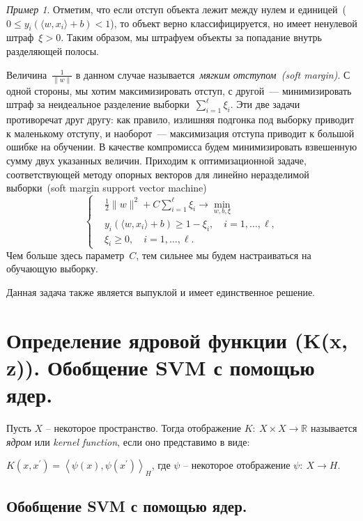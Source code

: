 \documentclass[a4paper, 12pt]{article}
\theoremstyle{plain} %
\theoremstyle{definition} %
\theoremstyle{remark} %
\newtheorem{example}{Пример}
\begin{document}
\begin{example}
Отметим, что если отступ объекта лежит между нулем и
единицей~($0 \leq y_i \left( \langle w, x_i \rangle + b \right) < 1$),
то объект верно классифицируется, но имеет ненулевой штраф~$\xi > 0$.
Таким образом, мы штрафуем объекты за попадание внутрь разделяющей полосы.

Величина~$\frac{1}{\|w\|}$ в данном случае называется~\emph{мягким отступом~(soft margin)}.
С одной стороны, мы хотим максимизировать отступ, с другой~--- минимизировать
штраф за неидеальное разделение выборки~$\sum_{i = 1}^{\ell} \xi_i$.
Эти две задачи противоречат друг другу: как правило, излишняя подгонка под
выборку приводит к маленькому отступу, и наоборот~--- максимизация отступа
приводит к большой ошибке на обучении.
В качестве компромисса будем минимизировать взвешенную сумму двух указанных величин.
Приходим к оптимизационной задаче,
соответствующей методу опорных векторов для линейно неразделимой выборки~(soft margin support vector machine)
\begin{equation}
\label{eq:svmUnsep}
    \left\{
        \begin{aligned}
            & \frac{1}{2} \|w\|^2 + C \sum_{i = 1}^{\ell} \xi_i \to \min_{w, b, \xi} \\
            & y_i \left(
                \langle w, x_i \rangle + b
            \right) \geq 1 - \xi_i, \quad i = 1, \dots, \ell, \\
            & \xi_i \geq 0, \quad i = 1, \dots, \ell.
        \end{aligned}
    \right.
\end{equation}
Чем больше здесь параметр~$C$, тем сильнее мы будем настраиваться на обучающую выборку.

Данная задача также является выпуклой и имеет единственное решение.

\section{Определение ядровой функции (K(x, z)). Обобщение SVM с помощью ядер.}

Пусть $X$ – некоторое пространство. Тогда отображение $K:\ X \times X \to \mathbb R$ называется \emph{ядром} или \emph{kernel function}, если оно представимо в виде:

$K \left(x,x^{\prime} \right) = \left< \psi(x), \psi (x^{\prime}) \right>_H $, где $ \psi $ – некоторое отображение $\psi:\ X \to H $.

\subsection{Обобщение SVM с помощью ядер.}


\end{example}
\end{document}
